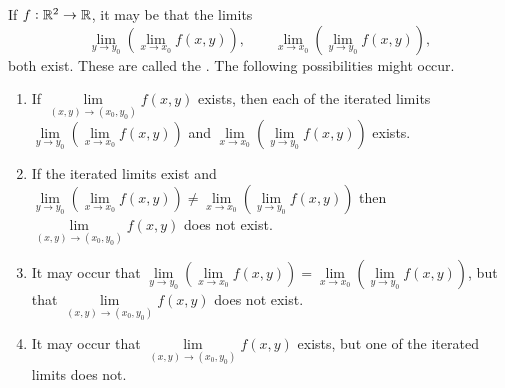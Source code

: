 \bigskip

If $f:\mathbb{R}^2\to \mathbb{R}$, it may be that the limits
$$ \lim\limits _{y\to y_0}\left(\lim\limits _{x\to x_0}f(x, y)\right), \qquad \lim\limits _{x\to x_0}\left(\lim\limits _{y\to y_0}f(x, y)\right), $$
both exist. These are called the . The following possibilities might occur.
\begin{enumerate}
\item If $\lim\limits _{(x,y)\to (x_0,y_0)} f(x,y)$ exists, then each of
the iterated limits $\lim\limits _{y\to y_0}\left(\lim\limits _{x\to x_0}f(x,
y)\right)$ and $\lim\limits _{x\to x_0}\left(\lim\limits _{y\to y_0}f(x,
y)\right)$ exists.
\item If the iterated limits exist and $\lim\limits _{y\to y_0}\left(\lim\limits _{x\to x_0}f(x, y)\right)\neq  \lim\limits _{x\to x_0}\left(\lim\limits _{y\to y_0}f(x, y)\right)$
then $\lim\limits _{(x,y)\to (x_0,y_0)} f(x,y)$ does not exist.
\item It may occur that $\lim\limits _{y\to y_0}\left(\lim\limits _{x\to x_0}f(x, y)\right)=  \lim\limits _{x\to x_0}\left(\lim\limits _{y\to y_0}f(x,
y)\right)$, but that $\lim\limits _{(x,y)\to (x_0,y_0)} f(x,y)$ does not
exist.
\item It may occur that  $\lim\limits _{(x,y)\to (x_0,y_0)} f(x,y)$
exists, but one of the iterated limits does not.
\end{enumerate}

